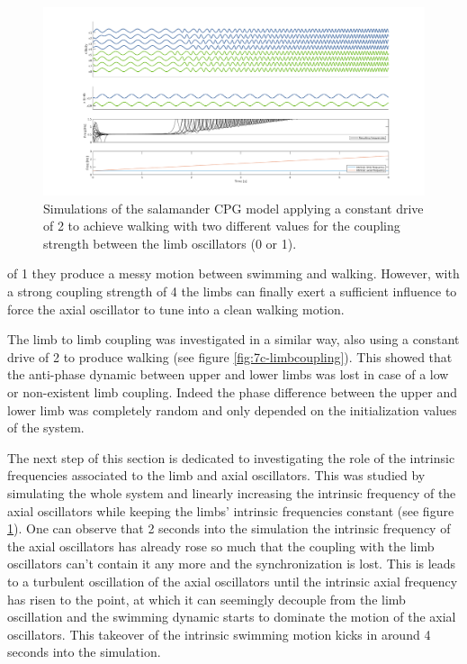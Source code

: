 \documentclass[a4paper]{scrartcl}
\begin{document}
\begin{figure}[!b]
	\includegraphics[width=\textwidth]{fig/figure7c_axialfreq.png}
	\caption{Simulations of the salamander CPG model applying a constant drive of 2 to achieve walking with two different values for the coupling strength between the limb oscillators (0 or 1).}
	\label{fig:7c-axialfreq}
\end{figure}




{\setlength{\parindent}{0 cm}
of 1 they produce a messy motion between swimming and walking. However, with a strong coupling strength of 4 the limbs can finally exert a sufficient influence to force the axial oscillator to tune into a clean walking motion.
}

The limb to limb coupling was investigated in a similar way, also using a constant drive of 2 to produce walking (see figure \ref{fig:7c-limbcoupling}). This showed that the anti-phase dynamic between upper and lower limbs was lost in case of a low or non-existent limb coupling. Indeed the phase difference between the upper and lower limb was completely random and only depended on the initialization values of the system.

The next step of this section is dedicated to investigating the role of the intrinsic frequencies associated to the limb and axial oscillators. This was studied by simulating the whole system and linearly increasing the intrinsic frequency of the axial oscillators while keeping the limbs' intrinsic frequencies constant (see figure \ref{fig:7c-axialfreq}). One can observe that 2 seconds into the simulation the intrinsic frequency of the axial oscillators has already rose so much that the coupling with the limb oscillators can't contain it any more and the synchronization is lost. This is leads to a turbulent oscillation of the axial oscillators until the intrinsic axial frequency has risen to the point, at which it can seemingly decouple from the limb oscillation and the swimming dynamic starts to dominate the motion of the axial oscillators. This takeover of the intrinsic swimming motion kicks in around 4 seconds into the simulation. 
\end{document}

